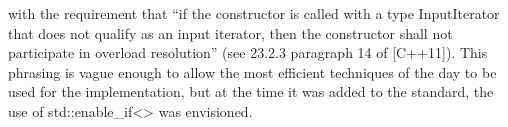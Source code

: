with the requirement that “if the constructor is called with a type InputIterator that does not qualify as an input iterator, then the constructor shall not participate in overload resolution” (see 23.2.3 paragraph 14 of [C++11]). This phrasing is vague enough to allow the most efficient techniques of the day to be used for the implementation, but at the time it was added to the standard, the use of std::enable\_if<> was envisioned.
























